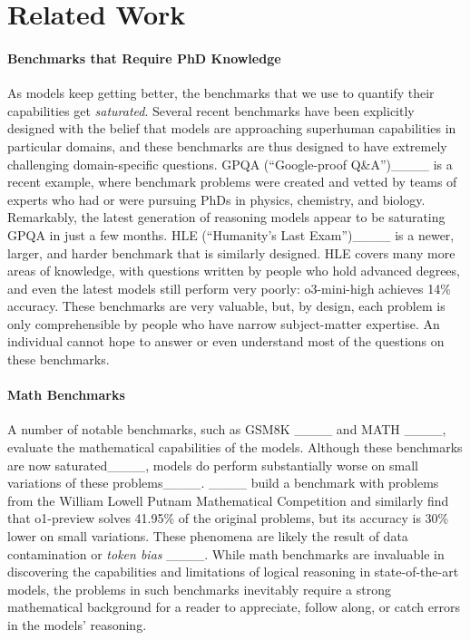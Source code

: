 \section{Related Work}
\paragraph{Benchmarks that Require PhD Knowledge}

As models keep getting better, the benchmarks that we use to quantify their capabilities get \emph{saturated}. Several recent benchmarks have been explicitly designed with the belief that models are approaching superhuman capabilities in particular domains, and these benchmarks are thus designed to have extremely challenging domain-specific questions. GPQA (``Google-proof Q\&A'')____ is a recent example, where benchmark problems were created and vetted by teams of experts who had or were pursuing PhDs in physics, chemistry, and biology. Remarkably, the latest generation of reasoning models appear to be saturating GPQA in just a few months. HLE (``Humanity's Last Exam'')____ is a newer, larger, and harder benchmark that is similarly designed. HLE covers many more areas of knowledge, with questions written by people who hold advanced degrees, and even the latest models still perform very poorly: o3-mini-high achieves 14\% accuracy. These benchmarks are very valuable, but, by design, each problem is only comprehensible by people who have narrow subject-matter expertise. An individual cannot hope to answer or even understand most of the questions on these benchmarks.

\paragraph{Math Benchmarks}
A number of notable benchmarks, 
such as GSM8K ____ and MATH ____,
evaluate the mathematical capabilities of the models. Although these benchmarks are now saturated____, models do perform substantially worse on small variations of these problems____.
____ build a benchmark with problems from the William Lowell Putnam Mathematical Competition and similarly find that o1-preview solves 41.95\% of the original problems, but its accuracy is 30\% lower on small variations. These phenomena are likely the result of data contamination or \textit{token bias} ____.
While math benchmarks are invaluable in discovering the capabilities and limitations of logical reasoning in state-of-the-art models, the problems in such benchmarks inevitably require a strong mathematical background for a reader to appreciate, follow along, or catch errors in the models' reasoning.

